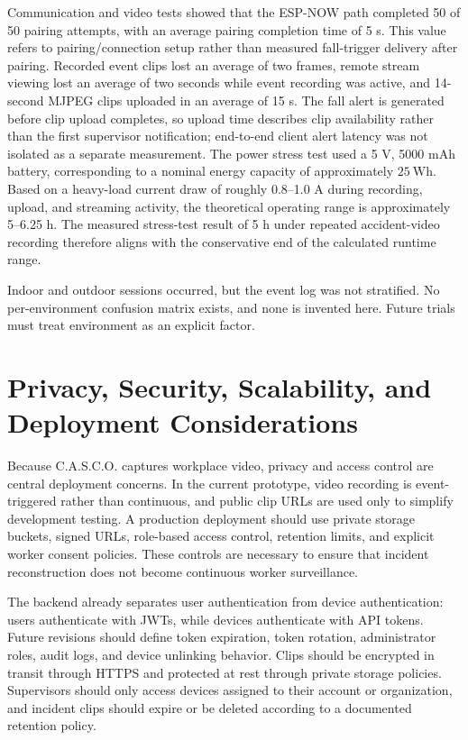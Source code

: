\documentclass[conference]{IEEEtran}
\begin{document}
Communication and video tests showed that the ESP-NOW path completed 50 of 50 pairing attempts, with an average pairing completion time of 5 s. This value refers to pairing/connection setup rather than measured fall-trigger delivery after pairing. Recorded event clips lost an average of two frames, remote stream viewing lost an average of two seconds while event recording was active, and 14-second MJPEG clips uploaded in an average of 15 s. The fall alert is generated before clip upload completes, so upload time describes clip availability rather than the first supervisor notification; end-to-end client alert latency was not isolated as a separate measurement. The power stress test used a 5 V, 5000 mAh battery, corresponding to a nominal energy capacity of approximately $25~\mathrm{Wh}$. Based on a heavy-load current draw of roughly 0.8--1.0 A during recording, upload, and streaming activity, the theoretical operating range is approximately 5--6.25 h. The measured stress-test result of 5 h under repeated accident-video recording therefore aligns with the conservative end of the calculated runtime range.

Indoor and outdoor sessions occurred, but the event log was not stratified. No per-environment confusion matrix exists, and none is invented here. Future trials must treat environment as an explicit factor.

\section{Privacy, Security, Scalability, and Deployment Considerations}
Because C.A.S.C.O. captures workplace video, privacy and access control are central deployment concerns. In the current prototype, video recording is event-triggered rather than continuous, and public clip URLs are used only to simplify development testing. A production deployment should use private storage buckets, signed URLs, role-based access control, retention limits, and explicit worker consent policies. These controls are necessary to ensure that incident reconstruction does not become continuous worker surveillance.

The backend already separates user authentication from device authentication: users authenticate with JWTs, while devices authenticate with API tokens. Future revisions should define token expiration, token rotation, administrator roles, audit logs, and device unlinking behavior. Clips should be encrypted in transit through HTTPS and protected at rest through private storage policies. Supervisors should only access devices assigned to their account or organization, and incident clips should expire or be deleted according to a documented retention policy.
\end{document}
